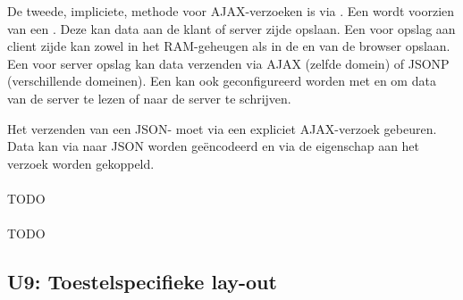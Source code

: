 De tweede,  impliciete,  methode voor AJAX-verzoeken is via .
Een  wordt voorzien van een .  
Deze kan data aan de klant of server zijde opslaan.  
Een  voor opslag aan client zijde kan zowel in het RAM-geheugen als in de  en  van de browser opslaan.  
Een  voor server opslag kan data verzenden via AJAX (zelfde domein) of JSONP (verschillende domeinen).  
Een  kan ook geconfigureerd worden met  en  om data van de server te lezen of naar de server te schrijven.

Het verzenden van een JSON- moet via een expliciet AJAX-verzoek gebeuren.
Data kan via  naar JSON worden geëncodeerd en via de  eigenschap aan het verzoek worden gekoppeld.

\paragraph{\kendo}
TODO

\paragraph{\lungo}
TODO

\begin{table}[H]
\centering
{}
\caption{Scores voor U8: AJAX}
\label{tabel:evaluatie-gebruik-u8}
\end{table}

\subsection{U9: Toestelspecifieke lay-out}

